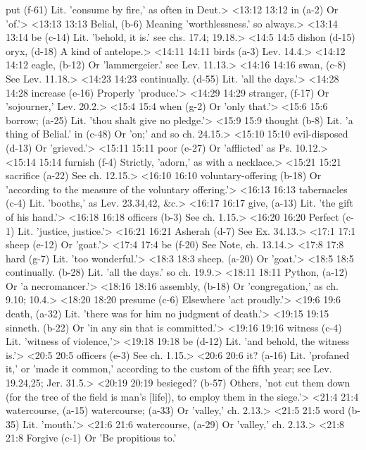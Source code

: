   put (f-61)  Lit. 'consume by fire,' as often in Deut.>
<13:12 13:12  in (a-2)  Or 'of.'>
<13:13 13:13  Belial, (b-6)  Meaning 'worthlessness.' so always.>
<13:14 13:14  be (c-14)  Lit. 'behold, it is.' see chs. 17.4; 19.18.>
<14:5 14:5  dishon (d-15)  oryx, (d-18)
  A kind of antelope.>
<14:11 14:11  birds (a-3)  Lev. 14.4.>
<14:12 14:12  eagle, (b-12)  Or 'lammergeier.' see Lev. 11.13.>
<14:16 14:16  swan, (c-8)  See Lev. 11.18.>
<14:23 14:23  continually. (d-55)  Lit. 'all the days.'>
<14:28 14:28  increase (e-16)  Properly 'produce.'>
<14:29 14:29  stranger, (f-17)  Or 'sojourner,' Lev. 20.2.>
<15:4 15:4  when (g-2)  Or 'only that.'>
<15:6 15:6  borrow; (a-25)  Lit. 'thou shalt give no pledge.'>
<15:9 15:9  thought (b-8)  Lit. 'a thing of Belial.'
  in (c-48)  Or 'on;' and so ch. 24.15.>
<15:10 15:10  evil-disposed (d-13)  Or 'grieved.'>
<15:11 15:11  poor (e-27)  Or 'afflicted' as Ps. 10.12.>
<15:14 15:14  furnish (f-4)  Strictly, 'adorn,' as with a necklace.>
<15:21 15:21  sacrifice (a-22)  See ch. 12.15.>
<16:10 16:10  voluntary-offering (b-18)  Or 'according to the measure of the voluntary offering.'>
<16:13 16:13  tabernacles (c-4)  Lit. 'booths,' as Lev. 23.34,42, &c.>
<16:17 16:17  give, (a-13)  Lit. 'the gift of his hand.'>
<16:18 16:18  officers (b-3)  See ch. 1.15.>
<16:20 16:20  Perfect (c-1)  Lit. 'justice, justice.'>
<16:21 16:21  Asherah (d-7)  See Ex. 34.13.>
<17:1 17:1  sheep (e-12)  Or 'goat.'>
<17:4 17:4  be (f-20)  See Note, ch. 13.14.>
<17:8 17:8  hard (g-7)  Lit. 'too wonderful.'>
<18:3 18:3  sheep. (a-20)  Or 'goat.'>
<18:5 18:5  continually. (b-28)  Lit. 'all the days.' so ch. 19.9.>
<18:11 18:11  Python, (a-12)  Or 'a necromancer.'>
<18:16 18:16  assembly, (b-18)  Or 'congregation,' as ch. 9.10; 10.4.>
<18:20 18:20  presume (c-6)  Elsewhere 'act proudly.'>
<19:6 19:6  death, (a-32)  Lit. 'there was for him no judgment of death.'>
<19:15 19:15  sinneth. (b-22)  Or 'in any sin that is committed.'>
<19:16 19:16  witness (c-4)  Lit. 'witness of violence,'>
<19:18 19:18  be (d-12)  Lit. 'and behold, the witness is.'>
<20:5 20:5  officers (e-3)  See ch. 1.15.>
<20:6 20:6  it? (a-16)  Lit. 'profaned it,' or 'made it common,' according to the  custom of the fifth year; see Lev. 19.24,25; Jer. 31.5.>
<20:19 20:19  besieged? (b-57)  Others, 'not cut them down (for the tree of the field is  man's [life]), to employ them in the siege.'>
<21:4 21:4  watercourse, (a-15)  watercourse; (a-33)
 Or 'valley,' ch. 2.13.>
<21:5 21:5  word (b-35)  Lit. 'mouth.'>
<21:6 21:6  watercourse, (a-29)  Or 'valley,' ch. 2.13.>
<21:8 21:8  Forgive (c-1)  Or 'Be propitious to.'
